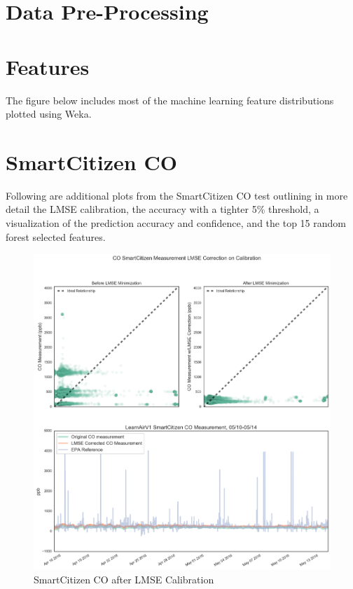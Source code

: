 \section{Data Pre-Processing}

\section{Features}


The figure below includes most of the machine learning feature distributions plotted using Weka.

\FloatBarrier
\section{SmartCitizen CO}
\FloatBarrier

Following are additional plots from the SmartCitizen CO test outlining in more detail the LMSE calibration, the accuracy with a tighter 5\% threshold, a visualization of the prediction accuracy and confidence, and the top 15 random forest selected features.

\begin{figure}[!htb]
 	\includegraphics[width=\textwidth]{figs/sck_co_lmse}               
 	 \caption{SmartCitizen CO after LMSE Calibration}
  	\label{fig:sck_co_lmse}
\end{figure}

